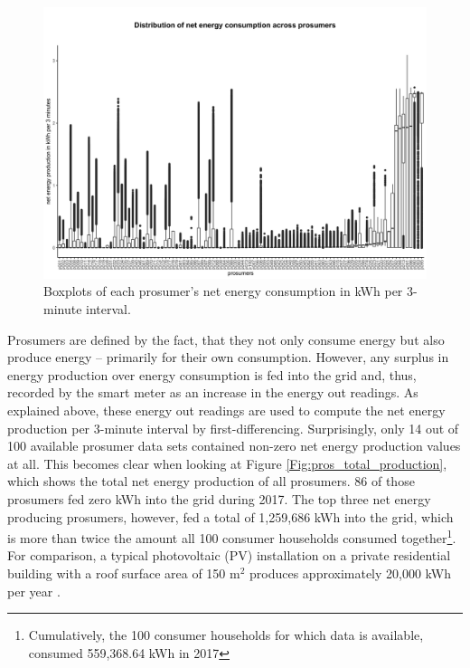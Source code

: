 \begin{figure}[htbp]
 \centering
\includegraphics[width=\textwidth]{thesis/graphs/prosumer_boxplots_consumption.jpg}
\caption[Boxplots of each prosumer's net energy consumption in kWh per 3-minute interval]{Boxplots of each prosumer's net energy consumption in kWh per 3-minute interval. \quantnet}
\label{Fig:pros_boxplots_consumption}
\end{figure}

Prosumers are defined by the fact, that they not only consume energy but also produce energy -- primarily for their own consumption. However, any surplus in energy production over energy consumption is fed into the grid and, thus, recorded by the smart meter as an increase in the energy out readings. As explained above, these energy out readings are used to compute the net energy production per 3-minute interval by first-differencing. Surprisingly, only 14 out of 100 available prosumer data sets contained non-zero net energy production values at all. This becomes clear when looking at Figure \ref{Fig:pros_total_production}, which shows the total net energy production of all prosumers. 86 of those prosumers fed zero kWh into the grid during 2017. The top three net energy producing prosumers, however, fed a total of 1,259,686 kWh into the grid, which is more than twice the amount all 100 consumer households consumed together\footnote{Cumulatively, the 100 consumer households for which data is available, consumed 559,368.64 kWh in 2017}. For comparison, a typical photovoltaic (PV) installation on a private residential building with a roof surface area of 150 m$^2$ produces approximately 20,000 kWh per year \citep{energieatlas:2018}.

